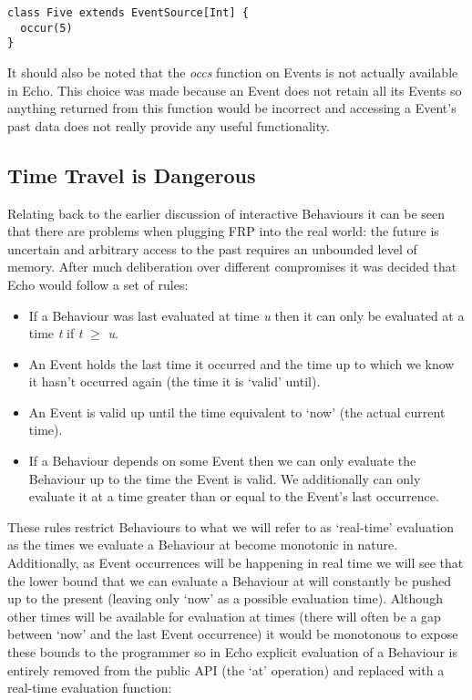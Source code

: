 \begin{verbatim}
class Five extends EventSource[Int] {
  occur(5)
}
\end{verbatim}

      It should also be noted that the \emph{occs} function on Events is not actually available in Echo. This
      choice was made because an Event does not retain all its Events so anything returned from this 
      function would be incorrect and accessing a Event's past data does not really
      provide any useful functionality.

    \subsection{Time Travel is Dangerous}
      Relating back to the earlier discussion of interactive Behaviours it can be seen
      that there are problems when plugging FRP into the real world: the future is uncertain and
      arbitrary access to the past requires an unbounded level of memory. After much deliberation
      over different compromises it was decided that Echo would follow a set of rules:
      
      \begin{itemize}
        \item If a Behaviour was last evaluated at time \emph{u} then it can only be evaluated at
        a time \emph{t} if \emph{t} $\geq$ \emph{u}.
        \item An Event holds the last time it occurred and the time up to which we know it hasn't occurred
        again (the time it is `valid' until).
        \item An Event is valid up until the time equivalent to `now' (the actual current time).
        \item If a Behaviour depends on some Event then we can only evaluate the Behaviour up to
        the time the Event is valid. We additionally can only evaluate it at a time greater than
        or equal to the Event's last occurrence.
      \end{itemize}
      
      These rules restrict Behaviours to what we will refer to as `real-time' evaluation as the times
      we evaluate a Behaviour at become monotonic in nature. Additionally, as Event occurrences will
      be happening in real time we will see that the lower bound that we can evaluate a Behaviour at will
      constantly be pushed up to the present (leaving only `now' as a possible evaluation time). Although
      other times will be available for evaluation at times (there will often be a gap between `now' and
      the last Event occurrence) it would be monotonous to expose these bounds to the programmer so
      in Echo explicit evaluation of a Behaviour is entirely removed from the public API (the
      `at' operation) and replaced with a real-time evaluation function:

